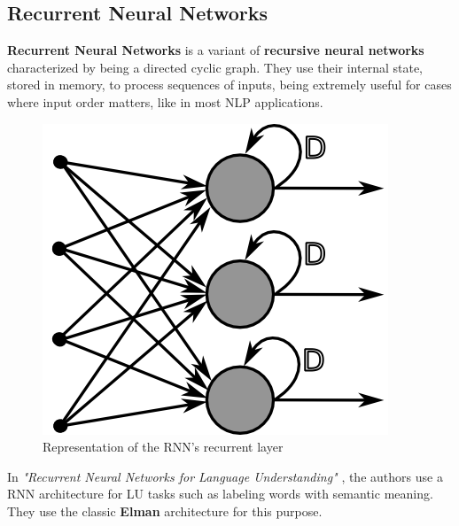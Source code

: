 \documentclass{scrartcl}
\begin{document}
    \subsection{ Recurrent Neural Networks }
    \textbf{Recurrent Neural Networks} is a variant of \textbf{recursive neural networks}
    characterized by being a directed cyclic graph. They use their internal state, stored
    in memory, to process sequences of inputs, being extremely useful for cases where
    input order matters, like in most NLP applications.
    \begin{figure}[h!]
        \centering
        \includegraphics[scale=0.4]{rnn.png}
        \caption{Representation of the RNN's recurrent layer}
    \end{figure} 
    In \textit{"Recurrent Neural Networks for Language Understanding"} \cite{rnn-lu}, 
    the authors use a RNN architecture for LU tasks such as labeling words with semantic
    meaning. They use the classic \textbf{Elman} architecture for this purpose.
\end{document}

